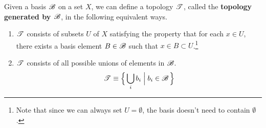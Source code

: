     \begin{theorem}
      Given a basis $\B$ on a set $X$, we can define a topology $\T$, called the \textbf{topology generated by $\B$}, in the following equivalent ways. 
      \begin{enumerate}
        \item $\T$ consists of subsets $U$ of $X$ satisfying the property that for each $x \in U$, there exists a basis element $B \in \B$ such that $x \in B \subset U$.\footnote{Note that since we can always set $U = \emptyset$, the basis doesn't need to contain $\emptyset$. }
        \begin{center}
        \end{center}

        \item $\T$ consists of all possible unions of elements in $\B$. 
        \begin{equation}
          \T \equiv \Big\{ \bigcup_i b_i \; \Big| \; b_i \in \B\Big\}
        \end{equation}
      \end{enumerate}
    \end{theorem} 

